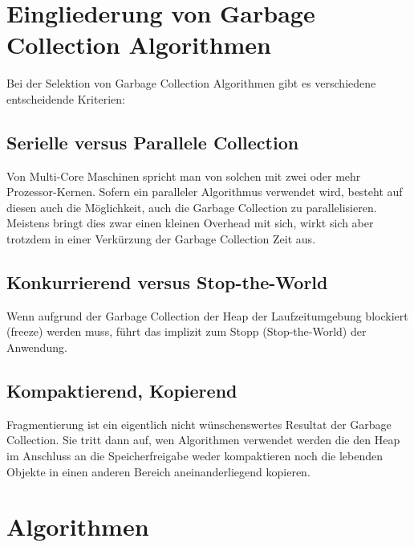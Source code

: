 \section{Eingliederung von Garbage Collection Algorithmen\cite[S. 5]{sunMemoryManagementWP}}
Bei der Selektion von Garbage Collection Algorithmen gibt es verschiedene entscheidende Kriterien:
\subsection{Serielle versus Parallele Collection}
Von Multi-Core Maschinen spricht man von solchen mit zwei oder mehr Prozessor-Kernen. Sofern ein paralleler Algorithmus verwendet wird, besteht auf diesen auch die Möglichkeit, auch die Garbage Collection zu parallelisieren. Meistens bringt dies zwar einen kleinen Overhead mit sich, wirkt sich aber trotzdem in einer Verkürzung der Garbage Collection Zeit aus.

\subsection{Konkurrierend versus Stop-the-World}
Wenn aufgrund der Garbage Collection der Heap der Laufzeitumgebung blockiert (freeze) werden muss, führt das implizit zum Stopp (Stop-the-World) der Anwendung.


\subsection{Kompaktierend, Kopierend}
Fragmentierung ist ein eigentlich nicht wünschenswertes Resultat der Garbage Collection. Sie tritt dann auf, wen Algorithmen verwendet werden die den Heap im Anschluss an die Speicherfreigabe weder kompaktieren noch die lebenden Objekte in einen anderen Bereich aneinanderliegend kopieren.

\section{Algorithmen}
